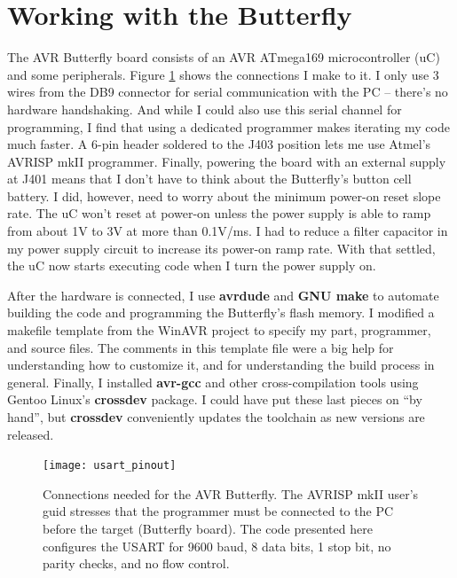 \section{Working with the Butterfly}
The AVR Butterfly board consists of an AVR ATmega169 microcontroller (uC) and some peripherals.  Figure \ref{fig:connections} shows the connections I make to it.  I only use 3 wires from the DB9 connector for serial communication with the PC -- there's no hardware handshaking.  And while I could also use this serial channel for programming, I find that using a dedicated programmer makes iterating my code much faster.  A 6-pin header soldered to the J403 position lets me use Atmel's AVRISP mkII programmer.  Finally, powering the board with an external supply at J401 means that I don't have to think about the Butterfly's button cell battery.  I did, however, need to worry about the minimum power-on reset slope rate.  The uC won't reset at power-on unless the power supply is able to ramp from about 1V to 3V at more than 0.1V/ms.  I had to reduce a filter capacitor in my power supply circuit to increase its power-on ramp rate.  With that settled, the uC now starts executing code when I turn the power supply on.

After the hardware is connected, I use \textbf{avrdude}\cite{avrdude} and \textbf{GNU make}\cite{gnumake} to automate building the code and programming the Butterfly's flash memory.  I modified a makefile template from the WinAVR project\cite{winavr} to specify my part, programmer, and source files.  The comments in this template file were a big help for understanding how to customize it, and for understanding the build process in general.  Finally, I installed \textbf{avr-gcc} and other cross-compilation tools using Gentoo Linux's \textbf{crossdev} package.  I could have put these last pieces on ``by hand'', but \textbf{crossdev} conveniently updates the toolchain as new versions are released.     

\begin{figure}[ht]
    \begin{center}
        \texttt{[image: usart\_pinout]}
        \caption{Connections needed for the AVR Butterfly.  The AVRISP mkII user's guid stresses that the programmer must be connected to the PC before the target (Butterfly board).  The code presented here configures the USART for 9600 baud, 8 data bits, 1 stop bit, no parity checks, and no flow control. \label{fig:connections}}
    \end{center}
\end{figure}

